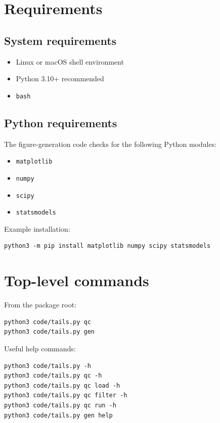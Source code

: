 \documentclass[11pt]{article}
\begin{document}
\section{Requirements}

\subsection{System requirements}

\begin{itemize}[nosep]
\item Linux or macOS shell environment
\item Python 3.10+ recommended
\item \texttt{bash}
\end{itemize}

\subsection{Python requirements}

The figure-generation code checks for the following Python modules:

\begin{itemize}[nosep]
\item \texttt{matplotlib}
\item \texttt{numpy}
\item \texttt{scipy}
\item \texttt{statsmodels}
\end{itemize}


Example installation:

\begin{verbatim}
python3 -m pip install matplotlib numpy scipy statsmodels 
\end{verbatim}

\section{Top-level commands}

From the package root:

\begin{verbatim}
python3 code/tails.py qc
python3 code/tails.py gen
\end{verbatim}

Useful help commands:

\begin{verbatim}
python3 code/tails.py -h
python3 code/tails.py qc -h
python3 code/tails.py qc load -h
python3 code/tails.py qc filter -h
python3 code/tails.py qc run -h
python3 code/tails.py gen help
\end{verbatim}
\end{document}
